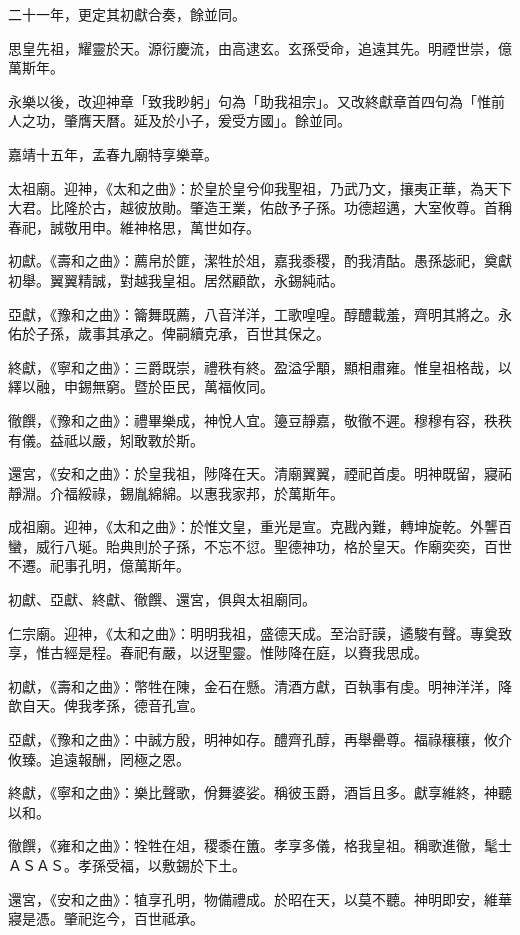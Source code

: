 二十一年，更定其初獻合奏，餘並同。

思皇先祖，耀靈於天。源衍慶流，由高逮玄。玄孫受命，追遠其先。明禋世崇，億萬斯年。

永樂以後，改迎神章「致我眇躬」句為「助我祖宗」。又改終獻章首四句為「惟前人之功，肇膺天曆。延及於小子，爰受方國」。餘並同。

嘉靖十五年，孟春九廟特享樂章。

太祖廟。迎神，《太和之曲》：於皇於皇兮仰我聖祖，乃武乃文，攘夷正華，為天下大君。比隆於古，越彼放勛。肇造王業，佑啟予子孫。功德超邁，大室攸尊。首稱春祀，誠敬用申。維神格思，萬世如存。

初獻。《壽和之曲》：薦帛於篚，潔牲於俎，嘉我黍稷，酌我清酤。愚孫毖祀，奠獻初舉。翼翼精誠，對越我皇祖。居然顧歆，永錫純祜。

亞獻，《豫和之曲》：籥舞既薦，八音洋洋，工歌喤喤。醇醴載羞，齊明其將之。永佑於子孫，歲事其承之。俾嗣續克承，百世其保之。

終獻，《寧和之曲》：三爵既崇，禮秩有終。盈溢孚顒，顯相肅雍。惟皇祖格哉，以繹以融，申錫無窮。暨於臣民，萬福攸同。

徹饌，《豫和之曲》：禮畢樂成，神悅人宜。籩豆靜嘉，敬徹不遲。穆穆有容，秩秩有儀。益祗以嚴，矧敢斁於斯。

還宮，《安和之曲》：於皇我祖，陟降在天。清廟翼翼，禋祀首虔。明神既留，寢祏靜淵。介福綏祿，錫胤綿綿。以惠我家邦，於萬斯年。

成祖廟。迎神，《太和之曲》：於惟文皇，重光是宣。克戡內難，轉坤旋乾。外讋百蠻，威行八埏。貽典則於子孫，不忘不愆。聖德神功，格於皇天。作廟奕奕，百世不遷。祀事孔明，億萬斯年。

初獻、亞獻、終獻、徹饌、還宮，俱與太祖廟同。

仁宗廟。迎神，《太和之曲》：明明我祖，盛德天成。至治訏謨，遹駿有聲。專奠致享，惟古經是程。春祀有嚴，以迓聖靈。惟陟降在庭，以賚我思成。

初獻，《壽和之曲》：幣牲在陳，金石在懸。清酒方獻，百執事有虔。明神洋洋，降歆自天。俾我孝孫，德音孔宣。

亞獻，《豫和之曲》：中誠方殷，明神如存。醴齊孔醇，再舉罍尊。福祿穰穰，攸介攸臻。追遠報酬，罔極之恩。

終獻，《寧和之曲》：樂比聲歌，佾舞婆娑。稱彼玉爵，酒旨且多。獻享維終，神聽以和。

徹饌，《雍和之曲》：牷牲在俎，稷黍在簠。孝享多儀，格我皇祖。稱歌進徹，髦士ＡＳＡＳ。孝孫受福，以敷錫於下土。

還宮，《安和之曲》：犆享孔明，物備禮成。於昭在天，以莫不聽。神明即安，維華寢是憑。肇祀迄今，百世祗承。

